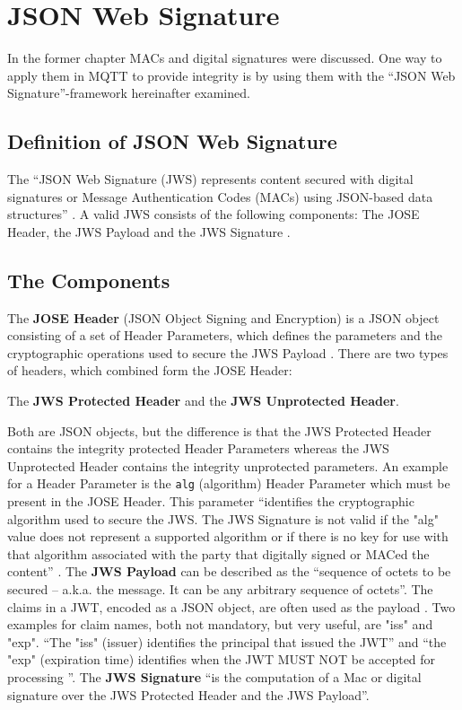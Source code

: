 \section{JSON Web Signature}

In the former chapter MACs and digital signatures were discussed. One way to apply them in MQTT to provide integrity is by using them with the ``JSON Web Signature''-framework hereinafter examined. 

\subsection{Definition of JSON Web Signature}
The ``JSON Web Signature (JWS) represents content secured with digital signatures or Message Authentication Codes (MACs) using JSON-based  data structures'' \cite{rfc7515}.
A valid JWS consists of the following components: The JOSE Header, the JWS Payload and the JWS Signature \cite{rfc7515}.\newline
\subsection{The Components}
The \textbf{JOSE Header} (JSON Object Signing and Encryption) is a JSON object consisting of a set of Header Parameters, which defines the parameters and the cryptographic operations used to secure the JWS Payload \cite{rfc7515}. There are two types of headers, which combined form the JOSE Header: \begin{center} The \textbf{JWS Protected Header} and the \textbf{JWS Unprotected Header}.
\end{center}
Both are JSON objects, but the difference is that the JWS Protected Header contains the integrity protected Header Parameters whereas the JWS Unprotected Header contains the integrity unprotected parameters.\newline
An example for a Header Parameter is the \texttt{alg} (algorithm) Header Parameter which must be present in the JOSE Header. This parameter ``identifies the cryptographic algorithm used to secure the JWS. The JWS Signature is not valid if the "alg" value does not represent a supported algorithm or if there is no key for use with that algorithm associated with the party that digitally signed or MACed the content'' \cite{rfc7515}.\newline \newline
The \textbf{JWS Payload} can be described as the ``sequence of octets to be secured -- a.k.a. the message. It can be any arbitrary sequence of octets''\cite{rfc7515}.\newline
The claims in a JWT, encoded as a JSON object, are often used as the payload \cite{rfc7519}.\newline
Two examples for claim names, both not mandatory, but very useful, are "iss" and "exp". ``The "iss" (issuer) identifies the principal that issued the JWT'' \cite{rfc7519} and ``the "exp" (expiration time) identifies when the JWT MUST NOT be accepted for processing ''\cite{rfc7519}. \newline \newline
The \textbf{JWS Signature} ``is the computation of a Mac or digital signature over the JWS Protected Header and the JWS Payload''\cite{rfc7515}.

